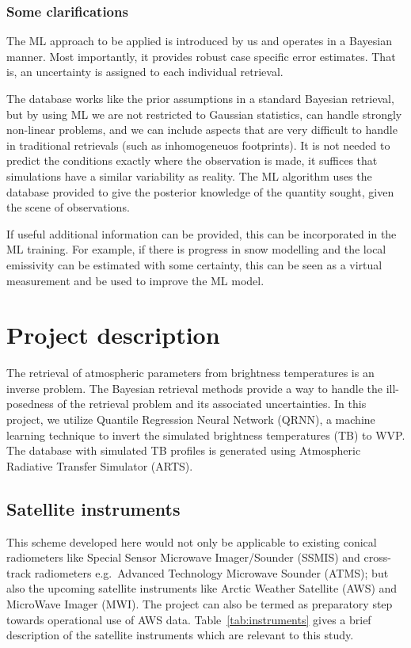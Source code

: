 \documentclass[12pt,oneside,a4paper]{article}
\begin{document}
\subsubsection{Some clarifications}

The ML approach to be applied is introduced by us and operates in a Bayesian
manner. Most importantly, it provides robust case specific error estimates.
That is, an uncertainty is assigned to each individual retrieval.

The database works like the prior assumptions in a standard Bayesian retrieval,
but by using ML we are not restricted to Gaussian statistics, can handle
strongly non-linear problems, and we can include aspects that are very
difficult to handle in traditional retrievals (such as inhomogeneuos
footprints). It is not needed to predict the conditions exactly where the
observation is made, it suffices that simulations have a similar variability as
reality. The ML algorithm uses the database provided to give the posterior
knowledge of the quantity sought, given the scene of observations.

If useful additional information can be provided, this can be incorporated in
the ML training. For example, if there is progress in snow modelling and the
local emissivity can be estimated with some certainty, this can be seen as a
virtual measurement and be used to improve the ML model.



\section{Project description}

The retrieval of atmospheric parameters from brightness temperatures is an inverse problem. The Bayesian retrieval methods provide a way to handle the ill-posedness of the retrieval problem and its associated uncertainties. In this project, we utilize  Quantile Regression Neural Network (QRNN), a machine learning technique to invert the simulated brightness temperatures (TB) to WVP. The database with simulated TB profiles is generated using Atmospheric Radiative Transfer Simulator (ARTS). 
 
\subsection{Satellite instruments}
This scheme developed here would not only be applicable to existing conical radiometers like  Special Sensor Microwave Imager/Sounder (SSMIS) and cross-track radiometers e.g.\, Advanced Technology Microwave Sounder (ATMS); but also the upcoming satellite instruments like Arctic Weather Satellite (AWS) and MicroWave Imager (MWI). The project can also be termed as preparatory step towards operational use of AWS data. Table~\ref{tab:instruments} gives a brief description of the satellite instruments which are relevant to this study. 
\end{document}
